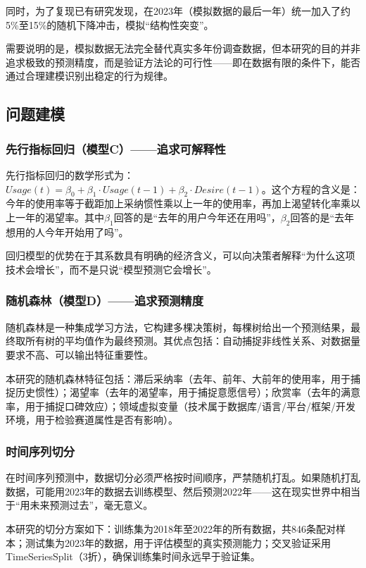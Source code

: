 \documentclass[fontset=windows]{cjc}
\begin{document}
同时，为了复现已有研究发现，在2023年（模拟数据的最后一年）统一加入了约5\%至15\%的随机下降冲击，模拟“结构性突变”。

需要说明的是，模拟数据无法完全替代真实多年份调查数据，但本研究的目的并非追求极致的预测精度，而是验证方法论的可行性——即在数据有限的条件下，能否通过合理建模识别出稳定的行为规律。

\subsection{问题建模}
\subsubsection{先行指标回归（模型C）——追求可解释性}
先行指标回归的数学形式为：$Usage(t) = \beta_0 + \beta_1 \cdot Usage(t-1) + \beta_2 \cdot Desire(t-1)$。这个方程的含义是：今年的使用率等于截距加上采纳惯性乘以上一年的使用率，再加上渴望转化率乘以上一年的渴望率。其中$\beta_1$回答的是“去年的用户今年还在用吗”，$\beta_2$回答的是“去年想用的人今年开始用了吗”。

回归模型的优势在于其系数具有明确的经济含义，可以向决策者解释“为什么这项技术会增长”，而不是只说“模型预测它会增长”。

\subsubsection{随机森林（模型D）——追求预测精度}
随机森林是一种集成学习方法，它构建多棵决策树，每棵树给出一个预测结果，最终取所有树的平均值作为最终预测。其优点包括：自动捕捉非线性关系、对数据量要求不高、可以输出特征重要性。

本研究的随机森林特征包括：滞后采纳率（去年、前年、大前年的使用率，用于捕捉历史惯性）；渴望率（去年的渴望率，用于捕捉意愿信号）；欣赏率（去年的满意率，用于捕捉口碑效应）；领域虚拟变量（技术属于数据库/语言/平台/框架/开发环境，用于检验赛道属性是否有影响）。

\subsubsection{时间序列切分}
在时间序列预测中，数据切分必须严格按时间顺序，严禁随机打乱。如果随机打乱数据，可能用2023年的数据去训练模型、然后预测2022年——这在现实世界中相当于“用未来预测过去”，毫无意义。

本研究的切分方案如下：训练集为2018年至2022年的所有数据，共846条配对样本；测试集为2023年的数据，用于评估模型的真实预测能力；交叉验证采用TimeSeriesSplit（3折），确保训练集时间永远早于验证集。
\end{document}
